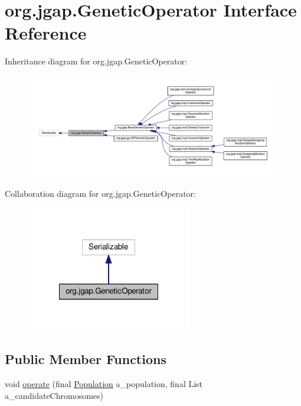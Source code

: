 \hypertarget{interfaceorg_1_1jgap_1_1_genetic_operator}{\section{org.\-jgap.\-Genetic\-Operator Interface Reference}
\label{interfaceorg_1_1jgap_1_1_genetic_operator}
}


Inheritance diagram for org.\-jgap.\-Genetic\-Operator\-:
\nopagebreak
\begin{figure}[H]
\begin{center}
\leavevmode
\includegraphics[width=350pt]{interfaceorg_1_1jgap_1_1_genetic_operator__inherit__graph}
\end{center}
\end{figure}


Collaboration diagram for org.\-jgap.\-Genetic\-Operator\-:
\nopagebreak
\begin{figure}[H]
\begin{center}
\leavevmode
\includegraphics[width=204pt]{interfaceorg_1_1jgap_1_1_genetic_operator__coll__graph}
\end{center}
\end{figure}
\subsection*{Public Member Functions}
\begin{DoxyCompactItemize}
\item 
void \hyperlink{interfaceorg_1_1jgap_1_1_genetic_operator_a0f9dfe925c4c21e07522be67d6c5d084}{operate} (final \hyperlink{classorg_1_1jgap_1_1_population}{Population} a\-\_\-population, final List a\-\_\-candidate\-Chromosomes)
\end{DoxyCompactItemize}
